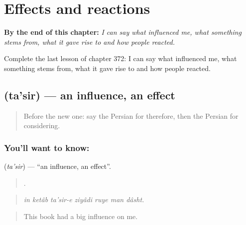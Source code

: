
\chapter{Effects and reactions}
\label{ch:fa-effects-and-reactions}

\begin{chapteropening}
\textbf{By the end of this chapter:} \emph{I can say what influenced me, what something stems from, what it gave rise to and how people reacted.}

Complete the last lesson of chapter 372: I can say what influenced me, what something stems from, what it gave rise to and how people reacted.
\end{chapteropening}

\section[\texorpdfstring{\fa{تاثیر} (ta'sir)}{تاثیر (ta'sir)}]{ (ta'sir) — an influence, an effect}

\label{lesson:FA-C372-tasir}



\begin{quote}
Before the new one: say the Persian for therefore, then the Persian for considering.
\end{quote}

\subsection*{You'll want to know: }
\textbf{} (\emph{ta'sir}) — \textquotedblleft{}an influence, an effect\textquotedblright{}.

\begin{quote}
      .
\end{quote}

\begin{quote}
\emph{in ketâb ta'sir-e ziyâdi ruye man dâsht.}
\end{quote}

\begin{quote}
This book had a big influence on me.
\end{quote}

